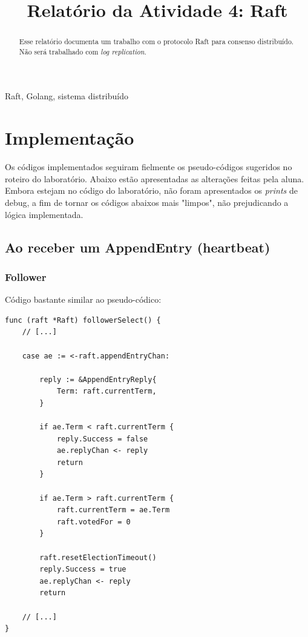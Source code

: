 \documentclass[journal,onecolumn]{IEEEtran}
\begin{document}
\title{Relatório da Atividade 4: Raft}

\author{
}

\maketitle

\begin{abstract}
Esse relatório documenta um trabalho com o protocolo Raft para consenso distribuído. Não será trabalhado com \textit{log replication}.
\end{abstract}

\begin{IEEEkeywords}
Raft, Golang, sistema distribuído
\end{IEEEkeywords}

\section{Implementação}

Os códigos implementados seguiram fielmente os pseudo-códigos sugeridos no roteiro do laboratório. Abaixo estão apresentadas as alterações feitas pela aluna. Embora estejam no código do laboratório, não foram apresentados os \textit{prints} de debug, a fim de tornar os códigos abaixos mais "limpos", não prejudicando a lógica implementada.

\subsection{Ao receber um AppendEntry (heartbeat)}

\subsubsection{Follower} Código bastante similar ao pseudo-códico:

\begin{lstlisting}
func (raft *Raft) followerSelect() {
	// [...]

	case ae := <-raft.appendEntryChan:

		reply := &AppendEntryReply{
			Term: raft.currentTerm,
		}

		if ae.Term < raft.currentTerm {
			reply.Success = false
			ae.replyChan <- reply
			return
		}

		if ae.Term > raft.currentTerm {
			raft.currentTerm = ae.Term
			raft.votedFor = 0
		}

		raft.resetElectionTimeout()
		reply.Success = true
		ae.replyChan <- reply
		return

	// [...]
}
\end{lstlisting}
\end{document}
